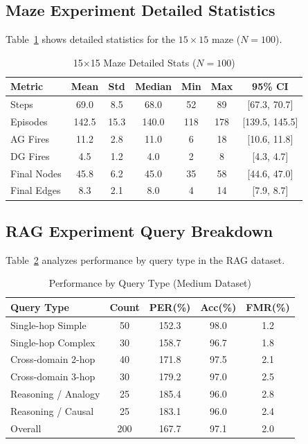 \documentclass[12pt]{article}
\begin{document}
\subsection{Maze Experiment Detailed Statistics}
Table~\ref{tab:maze_detail_15} shows detailed statistics for the $15{\times}15$ maze ($N=100$).
\begin{table}[H]
    \centering
    \caption{15×15 Maze Detailed Stats ($N=100$)}
    \label{tab:maze_detail_15}
    \small
    \begin{tabular}{lcccccc}
    \toprule
    Metric & Mean & Std & Median & Min & Max & 95\% CI \\
    \midrule
    Steps & 69.0 & 8.5 & 68.0 & 52 & 89 & [67.3, 70.7] \\
    Episodes & 142.5 & 15.3 & 140.0 & 118 & 178 & [139.5, 145.5] \\
    AG Fires & 11.2 & 2.8 & 11.0 & 6 & 18 & [10.6, 11.8] \\
    DG Fires & 4.5 & 1.2 & 4.0 & 2 & 8 & [4.3, 4.7] \\
    Final Nodes & 45.8 & 6.2 & 45.0 & 35 & 58 & [44.6, 47.0] \\
    Final Edges & 8.3 & 2.1 & 8.0 & 4 & 14 & [7.9, 8.7] \\
    \bottomrule
    \end{tabular}
\end{table}

\subsection{RAG Experiment Query Breakdown}
Table~\ref{tab:query_type} analyzes performance by query type in the RAG dataset.
\begin{table}[H]
    \centering
    \caption{Performance by Query Type (Medium Dataset)}
    \label{tab:query_type}
    \small
    \begin{tabular}{lcccc}
    \toprule
    Query Type & Count & PER(\%) & Acc(\%) & FMR(\%) \\
    \midrule
    Single-hop Simple & 50 & 152.3 & 98.0 & 1.2 \\
    Single-hop Complex & 30 & 158.7 & 96.7 & 1.8 \\
    Cross-domain 2-hop & 40 & 171.8 & 97.5 & 2.1 \\
    Cross-domain 3-hop & 30 & 179.2 & 97.0 & 2.5 \\
    Reasoning / Analogy & 25 & 185.4 & 96.0 & 2.8 \\
    Reasoning / Causal & 25 & 183.1 & 96.0 & 2.4 \\
    \midrule
    Overall & 200 & 167.7 & 97.1 & 2.0 \\
    \bottomrule
    \end{tabular}
\end{table}
\end{document}

